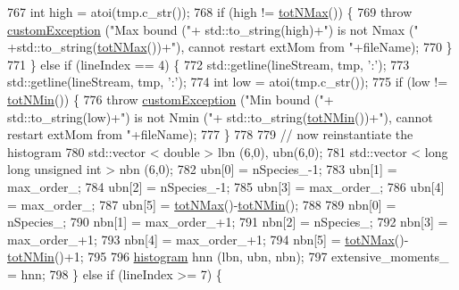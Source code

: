 \begin{DoxyCode}
767             \textcolor{keywordtype}{int} high = atoi(tmp.c\_str());
768             \textcolor{keywordflow}{if} (high != \hyperlink{classsim_system_aee2c65ecb43a35c0c4d070cdb45f7dc0}{totNMax}()) \{
769                 \textcolor{keywordflow}{throw} \hyperlink{classcustom_exception}{customException} (\textcolor{stringliteral}{"Max bound ("}+ std::to\_string(high)+\textcolor{stringliteral}{") is not Nmax ("}
      +std::to\_string(\hyperlink{classsim_system_aee2c65ecb43a35c0c4d070cdb45f7dc0}{totNMax}())+\textcolor{stringliteral}{"), cannot restart extMom from "}+fileName);
770             \}
771         \} \textcolor{keywordflow}{else} \textcolor{keywordflow}{if} (lineIndex == 4) \{
772             std::getline(lineStream, tmp, \textcolor{charliteral}{':'});
773             std::getline(lineStream, tmp, \textcolor{charliteral}{':'});
774             \textcolor{keywordtype}{int} low = atoi(tmp.c\_str());
775             \textcolor{keywordflow}{if} (low != \hyperlink{classsim_system_af10842e0eaa638373b8717c87b47e6bc}{totNMin}()) \{
776                 \textcolor{keywordflow}{throw} \hyperlink{classcustom_exception}{customException} (\textcolor{stringliteral}{"Min bound ("}+ std::to\_string(low)+\textcolor{stringliteral}{") is not Nmin ("}+
      std::to\_string(\hyperlink{classsim_system_af10842e0eaa638373b8717c87b47e6bc}{totNMin}())+\textcolor{stringliteral}{"), cannot restart extMom from "}+fileName);
777             \}
778 
779             \textcolor{comment}{// now reinstantiate the histogram}
780             std::vector < double > lbn (6,0), ubn(6,0);
781             std::vector < long long unsigned int > nbn (6,0);
782             ubn[0] = nSpecies\_-1;
783             ubn[1] = max\_order\_;
784             ubn[2] = nSpecies\_-1;
785             ubn[3] = max\_order\_;
786             ubn[4] = max\_order\_;
787             ubn[5] = \hyperlink{classsim_system_aee2c65ecb43a35c0c4d070cdb45f7dc0}{totNMax}()-\hyperlink{classsim_system_af10842e0eaa638373b8717c87b47e6bc}{totNMin}();
788 
789             nbn[0] = nSpecies\_;
790             nbn[1] = max\_order\_+1;
791             nbn[2] = nSpecies\_;
792             nbn[3] = max\_order\_+1;
793             nbn[4] = max\_order\_+1;
794             nbn[5] = \hyperlink{classsim_system_aee2c65ecb43a35c0c4d070cdb45f7dc0}{totNMax}()-\hyperlink{classsim_system_af10842e0eaa638373b8717c87b47e6bc}{totNMin}()+1;
795 
796             \hyperlink{classhistogram}{histogram} hnn (lbn, ubn, nbn);
797             extensive\_moments\_ = hnn;
798         \} \textcolor{keywordflow}{else} \textcolor{keywordflow}{if} (lineIndex >= 7) \{

\end{DoxyCode}
